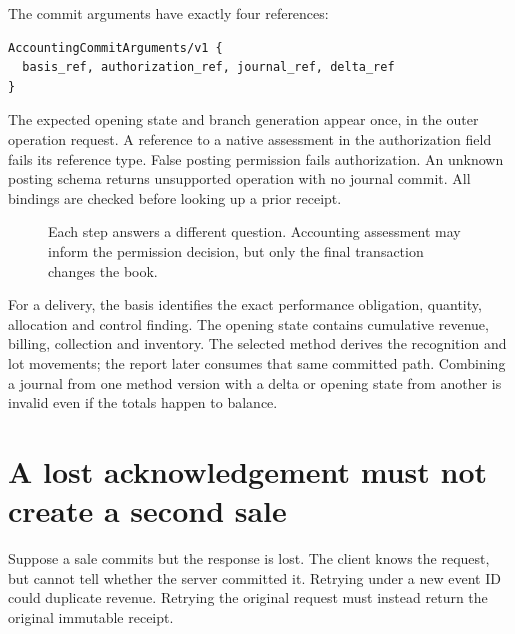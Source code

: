 The commit arguments have exactly four references:
\begin{lstlisting}
AccountingCommitArguments/v1 {
  basis_ref, authorization_ref, journal_ref, delta_ref
}
\end{lstlisting}
The expected opening state and branch generation appear once, in the outer
operation request. A reference to a native assessment in the authorization
field fails its reference type. False posting permission fails authorization.
An unknown posting schema returns unsupported operation with no journal commit.
All bindings are checked before looking up a prior receipt.

\begin{figure}[htbp]
\centering
{}
\caption{Each step answers a different question. Accounting assessment may
inform the permission decision, but only the final transaction changes the book.}
\end{figure}

For a delivery, the basis identifies the exact performance obligation,
quantity, allocation and control finding. The opening state contains cumulative
revenue, billing, collection and inventory. The selected method derives the
recognition and lot movements; the report later consumes that same committed
path. Combining a journal from one method version with a delta or opening state
from another is invalid even if the totals happen to balance.

\section{A lost acknowledgement must not create a second sale}
\label{sec:replay}

Suppose a sale commits but the response is lost. The client knows the request,
but cannot tell whether the server committed it. Retrying under a new event ID
could duplicate revenue. Retrying the original request must instead return the
original immutable receipt.

